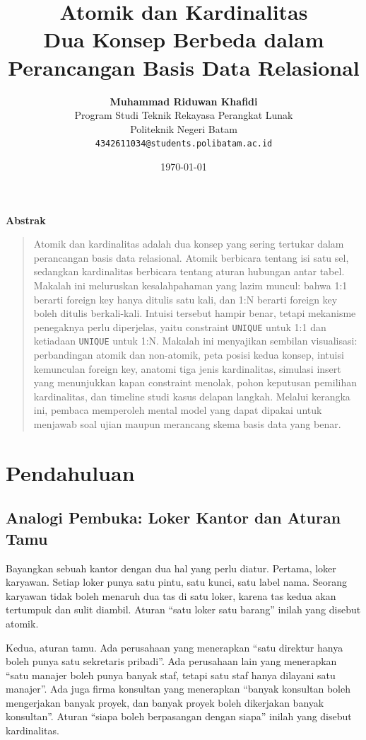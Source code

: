 \documentclass[11pt,a4paper]{article}
\title{\vspace{-1.5cm}\textbf{\sffamily\LARGE Atomik dan Kardinalitas\\ Dua Konsep Berbeda dalam Perancangan Basis Data Relasional}}
\author{
	\textbf{Muhammad Riduwan Khafidi} \\
	\small Program Studi Teknik Rekayasa Perangkat Lunak \\
	\small Politeknik Negeri Batam \\
	\small \texttt{4342611034@students.polibatam.ac.id}
}
\date{\small\today}
\renewenvironment{abstract}
{\small
	\begin{center}\textbf{\sffamily Abstrak}\end{center}
	\begin{quote}}
	{\end{quote}}
\begin{document}
\maketitle
\thispagestyle{empty}

\begin{abstract}
	Atomik dan kardinalitas adalah dua konsep yang sering tertukar dalam perancangan basis data relasional. Atomik berbicara tentang isi satu sel, sedangkan kardinalitas berbicara tentang aturan hubungan antar tabel. Makalah ini meluruskan kesalahpahaman yang lazim muncul: bahwa 1:1 berarti foreign key hanya ditulis satu kali, dan 1:N berarti foreign key boleh ditulis berkali-kali. Intuisi tersebut hampir benar, tetapi mekanisme penegaknya perlu diperjelas, yaitu constraint \texttt{UNIQUE} untuk 1:1 dan ketiadaan \texttt{UNIQUE} untuk 1:N. Makalah ini menyajikan sembilan visualisasi: perbandingan atomik dan non-atomik, peta posisi kedua konsep, intuisi kemunculan foreign key, anatomi tiga jenis kardinalitas, simulasi insert yang menunjukkan kapan constraint menolak, pohon keputusan pemilihan kardinalitas, dan timeline studi kasus delapan langkah. Melalui kerangka ini, pembaca memperoleh mental model yang dapat dipakai untuk menjawab soal ujian maupun merancang skema basis data yang benar.
\end{abstract}

\section{Pendahuluan}

\subsection{Analogi Pembuka: Loker Kantor dan Aturan Tamu}

Bayangkan sebuah kantor dengan dua hal yang perlu diatur. Pertama, loker karyawan. Setiap loker punya satu pintu, satu kunci, satu label nama. Seorang karyawan tidak boleh menaruh dua tas di satu loker, karena tas kedua akan tertumpuk dan sulit diambil. Aturan ``satu loker satu barang'' inilah yang disebut atomik.

Kedua, aturan tamu. Ada perusahaan yang menerapkan ``satu direktur hanya boleh punya satu sekretaris pribadi''. Ada perusahaan lain yang menerapkan ``satu manajer boleh punya banyak staf, tetapi satu staf hanya dilayani satu manajer''. Ada juga firma konsultan yang menerapkan ``banyak konsultan boleh mengerjakan banyak proyek, dan banyak proyek boleh dikerjakan banyak konsultan''. Aturan ``siapa boleh berpasangan dengan siapa'' inilah yang disebut kardinalitas.
\end{document}
